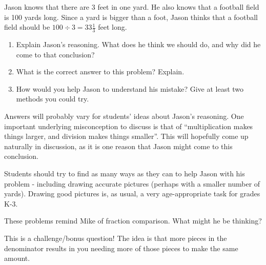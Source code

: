 \documentclass[handout]{ximera}
\begin{document}
\begin{problem}
    Jason knows that there are 3 feet in one yard.  He also knows that a football field is 100 yards long.  Since a yard is bigger than a foot, Jason thinks that a football field should be $100 \div 3 = 33 \frac{1}{3}$ feet long.
    \begin{enumerate}
    \item Explain Jason's reasoning.  What does he think we should do, and why did he come to that conclusion?
    \item What is the correct answer to this problem? Explain.
    \item How would you help Jason to understand his mistake?  Give at least two methods you could try.
    \end{enumerate}
   
    
    \begin{instructorNotes}
    Answers will probably vary for students' ideas about Jason's reasoning.  One important underlying misconception to discuss is that of ``multiplication makes things larger, and division makes things smaller''.  This will hopefully come up naturally in discussion, as it is one reason that Jason might come to this conclusion.  
    
    Students should try to find as many ways as they can to help Jason with his problem - including drawing accurate pictures (perhaps with a smaller number of yards).  Drawing good pictures is, as usual, a very age-appropriate task for grades K-3.
    \end{instructorNotes}
\end{problem}


\begin{problem}
These problems remind Mike of fraction comparison.  What might he be thinking?

\begin{instructorNotes}
This is a challenge/bonus question!  The idea is that more pieces in the denominator results in you needing more of those pieces to make the same amount.
\end{instructorNotes}
\end{problem}
\end{document}
